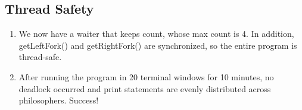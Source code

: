 \documentclass{article}
\begin{document}
\subsection{Thread Safety}
\begin{enumerate}
	\item [] We now have a waiter that keeps count, whose max count is 4. In addition, getLeftFork() and getRightFork() are synchronized, so the entire program is thread-safe.
	\item [] After running the program in 20 terminal windows for 10 minutes, no deadlock occurred and print statements are evenly distributed across philosophers. Success!
\end{enumerate}
\end{document}
